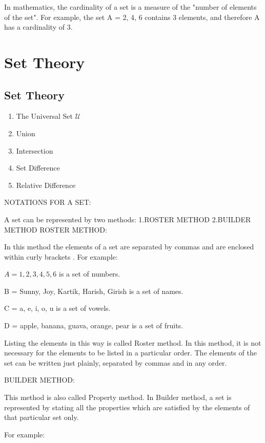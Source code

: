 \documentclass[]{report}
\begin{document}
\begin{enumerate}
In mathematics, the cardinality of a set is a measure of the "number of elements of the set". For example, the set A = {2, 4, 6} contains 3 elements, and therefore A has a cardinality of 3.





\chapter{Set Theory}



\section{Set Theory}
\begin{enumerate}
\item The Universal Set $\mathcal{U}$
\item Union
\item Intersection
\item Set Difference
\item Relative Difference
\end{enumerate}

\newpage


NOTATIONS FOR A SET:

A set can be represented by two methods:
1.ROSTER METHOD
2.BUILDER METHOD
ROSTER METHOD:

In this method the elements of a set are separated by commas and are enclosed within curly brackets { }. For example:

$A = {1, 2, 3, 4, 5, 6}$ is a set of numbers.

B = {Sunny, Joy, Kartik, Harish, Girish} is a set of names.

C = {a, e, i, o, u} is a set of vowels.

D = {apple, banana, guava, orange, pear} is a set of fruits.

Listing the elements in this way is called Roster method. In this method, it is not necessary for the elements to be listed in a particular order. The elements of the set can be written just plainly, separated by commas and in any order.


BUILDER METHOD:

This method is also called Property method. In Builder method, a set is represented by stating all the properties which are satisfied by the elements of that particular set only.

For example:


\end{enumerate}
\end{document}

